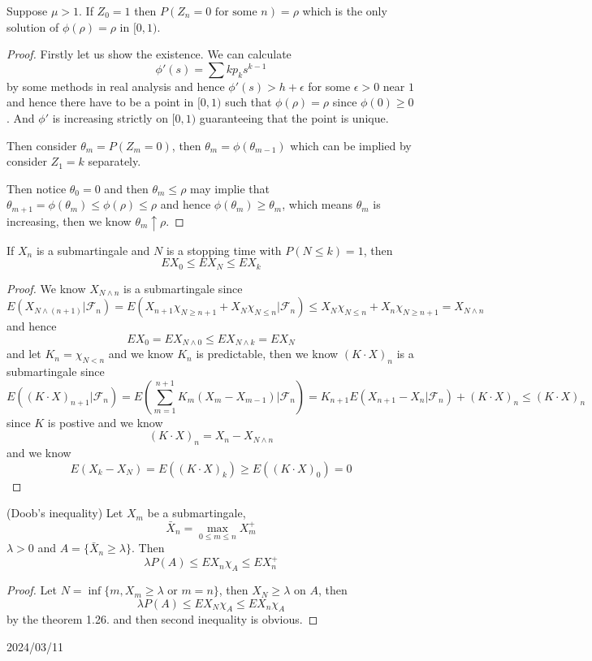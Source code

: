 \documentclass[lang=en, color=blue, ]{elegantbook}
\newcommand{\F}{\mathcal{F}}
\begin{document}
\begin{theorem}
    Suppose $\mu>1$. If $Z_0 = 1$ then $P(Z_n = 0\text{ for some }n) = \rho$ which is the only solution of $\phi(\rho) = \rho$ in $[0,1)$.    
\end{theorem}
\begin{proof}\par
    Firstly let us show the existence. We can calculate
    \[\phi'(s) = \sum kp_ks^{k-1}\]
    by some methods in real analysis and hence $\phi'(s) > h+\epsilon$ for some $\epsilon > 0$ near $1$ and hence there have to be a point in $[0,1)$ such that $\phi(\rho) = \rho$ since $\phi(0)\geq 0$. And $\phi'$ is increasing strictly on $[0,1)$ guaranteeing that the point is unique.\par
    Then consider $\theta_m = P(Z_m = 0)$, then $\theta_m = \phi(\theta_{m-1})$ which can be implied by consider $Z_1 = k$ separately.\par
    Then notice $\theta_0 = 0$ and then $\theta_m \leq \rho$ may implie that $\theta_{m+1} = \phi(\theta_m) \leq \phi(\rho) \leq \rho$ and hence $\phi(\theta_m) \geq \theta_m$, which means $\theta_m$ is increasing, then we know $\theta_m \uparrow \rho$.
\end{proof}

\begin{theorem}
    If $X_n$ is a submartingale and $N$ is a stopping time with $P(N\leq k )= 1$, then 
    \[
    EX_0 \leq EX_N \leq EX_k
    \]
\end{theorem}
\begin{proof}\par
    We know $X_{N\wedge n}$ is a submartingale since
    \[
    E(X_{N\wedge (n+1)}|\F_n) = E(X_{n+1}\chi_{N\geq n+1} + X_{N}\chi_{N \leq n}|\F_n) \leq X_N\chi_{N\leq n} + X_n\chi_{N\geq n+1} = X_{N\wedge n}
    \]
    and hence
    \[
    EX_0 = EX_{N\wedge 0} \leq EX_{N\wedge k} = EX_N  
    \]
    and let $K_n = \chi_{N<n}$ and we know $K_n$ is predictable, then we know $(K\cdot X)_n$ is a submartingale since
    \[
    E((K\cdot X)_{n+1}|\F_n) = E(\sum\limits_{m=1}^{n+1}K_m(X_m-X_{m-1})|\F_n) = K_{n+1}E(X_{n+1}-X_n|\F_n) + (K\cdot X)_n \leq (K\cdot X)_n
    \]
    since $K$ is postive and we know
    \[(K\cdot X)_{n} = X_n - X_{N\wedge n}\]
    and we know
    \[
    E(X_k - X_N) = E((K\cdot X)_k) \geq E((K\cdot X)_0) = 0
    \]
\end{proof}

\begin{theorem}
    (Doob's inequality) Let $X_m$ be a submartingale,
    \[\bar{X}_n = \max_{0\leq m \leq n}X_m^+\]
    $\lambda > 0$ and $A = \{\bar{X}_n \geq \lambda\}$. Then
    \[\lambda P(A) \leq EX_n\chi_A \leq EX_n^+\]
\end{theorem}
\begin{proof}\par
    Let $N = \inf\{m,X_m\geq\lambda\text{ or }m=n\}$, then $X_N \geq \lambda$ on $A$, then
    \[\lambda P(A)\leq EX_N\chi_A \leq EX_n\chi_A\]
    by the theorem 1.26. and then second inequality is obvious.
\end{proof}

2024/03/11
\end{document}
